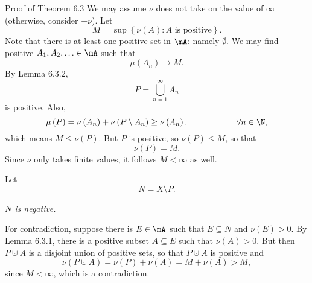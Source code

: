\documentclass[pmath451]{subfiles}
\begin{document}
    \begin{boxyproof}{Proof of Theorem 6.3}
        We may assume $\nu$ does not take on the value of $\infty$ (otherwise, consider $-\nu$). Let
        \begin{equation*}
            M = \sup\left\lbrace \nu\left( A \right) : A \text{ is positive} \right\rbrace.
        \end{equation*}
        Note that there is at least one positive set in $\mA$: namely $\emptyset$. We may find positive $A_1,A_2,\ldots\in\mA$ such that
        \begin{equation*}
            \mu\left( A_n \right)\to M.
        \end{equation*}
        By Lemma 6.3.2,
        \begin{equation*}
            P = \bigcup^{\infty}_{n=1}A_n
        \end{equation*}
        is positive. Also,
        \begin{equation*}
            \mu\left( P \right) = \nu\left( A_n \right) + \nu\left( P\setminus A_n \right) \geq \nu\left( A_n \right), \hspace{2cm}\forall n\in\N,
        \end{equation*}
        which means $M\leq\nu\left( P \right)$. But $P$ is positive, so $\nu\left( P \right)\leq M$, so that
        \begin{equation*}
            \nu\left( P \right) = M.
        \end{equation*}
        Since $\nu$ only takes finite values, it follows $M<\infty$ as well.

        Let 
        \begin{equation*}
            N = X\setminus P.
        \end{equation*}

        \begin{claim}
            \textit{$N$ is negative.}

            For contradiction, suppose there is $E\in\mA$ such that $E\subseteq N$ and $\nu\left( E \right)>0$. By Lemma 6.3.1, there is a positive subset $A\subseteq E$ such that $\nu\left( A \right)>0$. But then $P\cupdot A$ is a disjoint union of positive sets, so that $P\cupdot A$ is positive and
            \begin{equation*}
                \nu\left( P\cupdot A \right) = \nu\left( P \right) + \nu\left( A \right) = M+\nu\left( A \right)>M,
            \end{equation*}
            since $M<\infty$, which is a contradiction.
        \end{claim}


\end{boxyproof}
\end{document}
